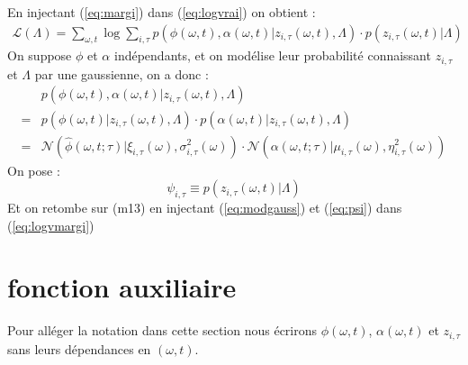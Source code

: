 \documentclass[a4paper,12pt]{article}
\begin{document}
En injectant (\ref{eq:margi}) dans (\ref{eq:logvrai}) on obtient :
\begin{align}
 \mathcal{L}(\Lambda) = \displaystyle\sum_{\omega,t} \log \displaystyle\sum_{i, \tau} p(\phi(\omega,t), \alpha(\omega,t) | z_{i, \tau}(\omega,t), \Lambda) \cdot p(z_{i, \tau}(\omega,t) | \Lambda) \label{eq:logvmargi}
\end{align}
On suppose $\phi$ et $\alpha$ indépendants, et on modélise leur probabilité connaissant $z_{i,\tau}$ et $\Lambda$ par une gaussienne, on a donc :
\begin{align}
& p(\phi(\omega,t), \alpha(\omega,t) | z_{i, \tau}(\omega,t), \Lambda) \nonumber\\
= & p(\phi(\omega,t) | z_{i, \tau}(\omega,t), \Lambda) \cdot p(\alpha(\omega,t) | z_{i, \tau}(\omega,t), \Lambda) \nonumber\\
= & \mathcal{N}(\hat{\phi}(\omega,t;\tau) | \xi_{i,\tau}(\omega),\sigma^{2}_{i,\tau}(\omega)) \cdot \mathcal{N}(\alpha(\omega,t;\tau) | \mu_{i,\tau}(\omega),\eta^{2}_{i,\tau}(\omega)) \label{eq:modgauss}
\end{align}
On pose :
\begin{equation}
\psi_{i,\tau} \equiv  p(z_{i, \tau}(\omega,t) | \Lambda) \label{eq:psi}
\end{equation}
Et on retombe sur (m13) en injectant (\ref{eq:modgauss}) et (\ref{eq:psi}) dans (\ref{eq:logvmargi})
\section{fonction auxiliaire}
Pour alléger la notation dans cette section nous écrirons $\phi(\omega,t)$, $\alpha(\omega,t)$ et $z_{i, \tau}$ sans leurs dépendances en $(\omega,t)$.
\end{document}
